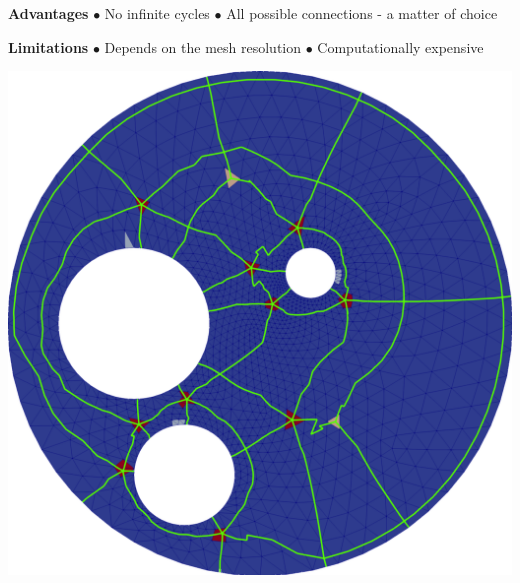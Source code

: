 \documentclass[a0paper,portrait, fontscale=0.33]{baposter}
\begin{document}
\begin{poster}
{\begin{tcolorbox}[colframe=gray,boxrule=0.8pt,title=\Large Discrete Strategy]
\begin{minipage}[b]{0.455\linewidth}%
\textbf{Advantages}
\newline
\medskip%
$\bullet$ No infinite cycles
\newline
$\bullet$ All possible connections - a matter of choice
\end{minipage}
\vspace{0.05\linewidth}
\begin{minipage}[b]{0.455\linewidth}	%
\textbf{Limitations}
\newline
\medskip
$\bullet$ Depends on the mesh resolution
\newline
$\bullet$ Computationally expensive
\newline
\end{minipage}
\vspace{-0.6cm}
\end{tcolorbox}
\captionsetup{labelformat=empty}
\noindent
\begin{minipage}[b]{0.53\linewidth}%
\includegraphics[width=\textwidth]{CWCH_coarse-shortest_paths}%

\end{minipage}}
\end{poster}
\end{document}
